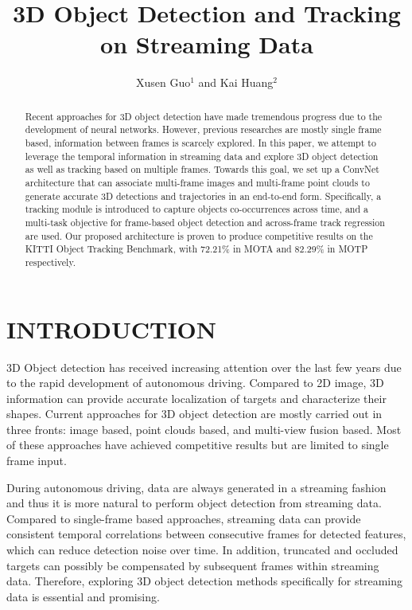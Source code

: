 \documentclass[letterpaper, 10 pt, conference]{ieeeconf}  %
\title{\LARGE \bf
3D Object Detection and Tracking on Streaming Data
}
\author{Xusen Guo$^{1}$ and Kai Huang$^{2}$%
}
\begin{document}
\maketitle
\thispagestyle{empty}
\pagestyle{empty}


\begin{abstract}

Recent approaches for 3D object detection have made tremendous progress due to the development of neural networks. However, previous researches are mostly single frame based, information between frames is scarcely explored. In this paper, we attempt to leverage the temporal information in streaming data and explore 3D object detection as well as tracking based on multiple frames. Towards this goal, we set up a ConvNet architecture that can associate multi-frame images and multi-frame point clouds to generate accurate 3D detections and trajectories in an end-to-end form. Specifically, a tracking module is introduced to capture objects co-occurrences across time, and a multi-task objective for frame-based object detection and across-frame track regression are used. Our proposed architecture is proven to produce competitive results on the KITTI Object Tracking Benchmark, with 72.21\% in MOTA and 82.29\% in MOTP respectively.

\end{abstract}


\section{INTRODUCTION}

3D Object detection has received increasing attention over the last few years due to the rapid development of autonomous driving. Compared to 2D image, 3D information can provide accurate localization of targets and characterize their shapes. Current approaches for 3D object detection are mostly carried out in three fronts: image based\cite{7780605, chen20183d}, point clouds based\cite{zhou2018voxelnet,yang2018pixor,simon2018complex}, and multi-view fusion based\cite{chen2017multi,ku2018joint}. Most of these approaches have achieved competitive results but are limited to single frame input.

During autonomous driving, data are always generated in a streaming fashion and thus it is more natural to perform object detection from streaming data. Compared to single-frame based approaches, streaming data can provide consistent temporal correlations between consecutive frames for detected features, which can reduce detection noise over time. In addition, truncated and occluded targets can possibly be compensated by subsequent frames within streaming data. Therefore, exploring 3D object detection methods specifically for streaming data is essential and promising.
\end{document}
